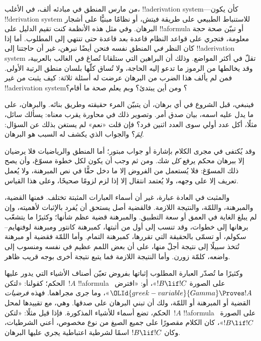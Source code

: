 \documentclass[../../../include/open-logic-section]{subfiles}
\begin{document}


من مارس المنطق في مبادئه ألف، في الأغلب، !!a{derivation}
system---كأن يكون !!{derivation} system للاستنباط الطبيعي على طريقة
فيتش، أو نظامًا مبنيًّا على أشجار البرهان. وفي مثل هذه الأنظمة كنت
تقيم الدليل على !!a{formula} أو تبيّن صحة حجة معلومة، فتجري على قواعد
النظام قاعدة بعد قاعدة حتى تنتهي إلى المطلوب. أما إذا كان النظر
\emph{في} المنطق نفسه فنحن أيضًا نبرهن، غير أن حاجتنا إلى
!!a{derivation} system تقلّ في أكثر المواضع. وذلك أن البراهين التي
ستلقانا تُصاغ في الغالب بالعربية، وقد يخالطها من الرموز ما تدعو إليه
الحاجة، ولا تُساق كلّها بلسان منطق الرتبة الأولى. فمن لم يألف هذا
الضرب من البرهان عرضت له أسئلة ثلاثة: كيف يثبت من غير
!!a{derivation} system؟ ومن أين يبتدئ؟ وبم يعلم صحة ما أقام؟

فينبغي، قبل الشروع في أي برهان، أن يتبيّن المرء حقيقته وطريق بنائه.
والبرهان، على ما يدل عليه اسمه، بيان صدق أمر. وتصوير ذلك في محاورة
يقرب معناه: يسألك سائل، مثلًا، أكل عدد أولي سوى العدد اثنين فرد؟ فإن
قلت «نعم» لم يستغن بذلك عن السؤال: \emph{لِمَ}؟ والجواب الذي يكشف له
السبب هو البرهان.

وقد يُكتفى في مجرى الكلام بإشارة أو جواب مبتور؛ أما المنطق والرياضيات
فلا يرضيان إلا ببرهان محكم يرفع \emph{كل} شك. ومن ثم وجب أن يكون لكل
خطوة مسوّغ، وأن يصح ذلك المسوّغ: فلا يُستعمل من الفروض إلا ما دخل
حقًّا في نص المبرهنة، ولا يُعمل تعريف إلا على وجهه، ولا يُعتمد انتقال
إلا إذا لزم لزومًا صحيحًا، وعلى هذا القياس.

والمثبت في العادة عبارة، غير أن أسماء العبارات المثبتة تختلف. فمنها
القضية، والمبرهنة، واللمّة، والنتيجة اللازمة. فالقضية أصل يستحق أن
يُفرد بالإثبات لأهميته، وإن لم يبلغ الغاية في العمق أو سعة التطبيق.
والمبرهنة قضية عظم شأنها؛ وكثيرًا ما يتشعّب برهانها إلى خطوات، وقد
تنسب إلى أول من أثبتها، كمبرهنة كانتور ومبرهنة لوفنهايم--سكولم، أو
تسمّى بالحقيقة التي تقررها، كمبرهنة التمام. وأما اللمّة فقضية أو
مبرهنة تُتخذ سبيلًا إلى نتيجة أجلّ منها، على أن بعض اللمم عظيم في
نفسه ومنسوب إلى واضعه، كلمّة زورن. وأما النتيجة اللازمة فما يتبع
نتيجة أخرى بوجه قريب ظاهر.

وكثيرًا ما تُصدّر العبارة المطلوب إثباتها بفروض تعيّن أصناف الأشياء
التي يدور عليها الحكم؛ كقولنا: «لتكن~$!A$ !!a{formula} على الصورة
$!B \lif !C$»، أو: «افترض~${\OLId{greek-variable}{Gamma}} \Proves !A$»، وما جرى مجراهما.
فهذه \emph{فرضيات} القضية أو المبرهنة أو اللمّة، ولك أن تبني البرهان
على صدقها. وهي، مع تقييدها لمحل الحكم، تضع أسماء للأشياء المذكورة.
فإذا قيل مثلًا: «لتكن~$!A$ !!a{formula} على الصورة~$!B \lif !C$»،
كان الكلام مقصورًا على جميع الصيغ من نوع مخصوص، أعني الشرطيات، وكان
$!B \lif !C$ اسمًا لشرطية اعتباطية يجري عليها البرهان.
\end{document}
